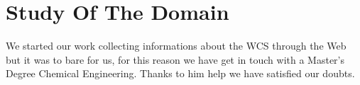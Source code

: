 \section{\textbf{Study Of The Domain}}
We started our work collecting informations about the WCS through the Web but it was to bare for us, for this reason we have get in touch with a Master’s Degree Chemical Engineering. Thanks to him help we have satisfied our doubts.
